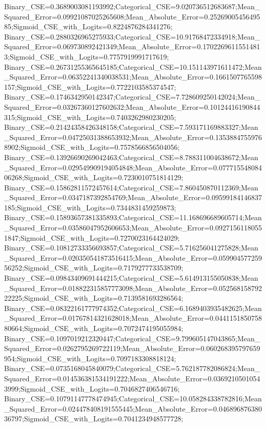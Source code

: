 Binary_CSE=0.3689003081193992;Categorical_CSE=9.020736512683687;Mean_Squared_Error=0.09921087025265608;Mean_Absolute_Error=0.2526900545649585;Sigmoid_CSE_with_Logits=0.8224876284341276;
Binary_CSE=0.2880326965275933;Categorical_CSE=10.91768472334918;Mean_Squared_Error=0.069730892421349;Mean_Absolute_Error=0.17022696115514813;Sigmoid_CSE_with_Logits=0.7757919991717619;
Binary_CSE=0.26731255365645185;Categorical_CSE=10.151143971611472;Mean_Squared_Error=0.06352241340038531;Mean_Absolute_Error=0.1661507765598157;Sigmoid_CSE_with_Logits=0.7722103585374547;
Binary_CSE=0.1746342950142347;Categorical_CSE=7.728609250142024;Mean_Squared_Error=0.03267360127602632;Mean_Absolute_Error=0.10124416190844315;Sigmoid_CSE_with_Logits=0.7403262980230205;
Binary_CSE=0.21424358426348158;Categorical_CSE=7.593171169883327;Mean_Squared_Error=0.04725031388653932;Mean_Absolute_Error=0.13538847559768902;Sigmoid_CSE_with_Logits=0.7578566856504056;
Binary_CSE=0.13926690269042463;Categorical_CSE=8.788311004638672;Mean_Squared_Error=0.029549909194054848;Mean_Absolute_Error=0.07771554808406268;Sigmoid_CSE_with_Logits=0.7230010751814129;
Binary_CSE=0.15862811572457614;Categorical_CSE=7.860450870112369;Mean_Squared_Error=0.0347187392854769;Mean_Absolute_Error=0.09599184146837185;Sigmoid_CSE_with_Logits=0.7344831459259873;
Binary_CSE=0.15893657381335893;Categorical_CSE=11.168696689605714;Mean_Squared_Error=0.03586047952606653;Mean_Absolute_Error=0.09271561180551847;Sigmoid_CSE_with_Logits=0.7270023164424029;
Binary_CSE=0.10812733356693857;Categorical_CSE=5.716256041275828;Mean_Squared_Error=0.020350541873516415;Mean_Absolute_Error=0.05990457725956252;Sigmoid_CSE_with_Logits=0.7179277733538709;
Binary_CSE=0.09843409691444215;Categorical_CSE=5.614913155050838;Mean_Squared_Error=0.018822315857773098;Mean_Absolute_Error=0.05256815879222225;Sigmoid_CSE_with_Logits=0.7139581693286564;
Binary_CSE=0.08322161777974352;Categorical_CSE=6.1689403935482625;Mean_Squared_Error=0.01767814321628018;Mean_Absolute_Error=0.044115185075880664;Sigmoid_CSE_with_Logits=0.7072474195055984;
Binary_CSE=0.1097019212320447;Categorical_CSE=9.799605147043865;Mean_Squared_Error=0.0262795269722119;Mean_Absolute_Error=0.060268395797659954;Sigmoid_CSE_with_Logits=0.7097183308818124;
Binary_CSE=0.0735168045840079;Categorical_CSE=5.762187782086824;Mean_Squared_Error=0.014536381534191222;Mean_Absolute_Error=0.03692105010543999;Sigmoid_CSE_with_Logits=0.7046827406546716;
Binary_CSE=0.10791147778474945;Categorical_CSE=10.058284338782816;Mean_Squared_Error=0.024478408191555445;Mean_Absolute_Error=0.04689687638036797;Sigmoid_CSE_with_Logits=0.7041234948577728;
